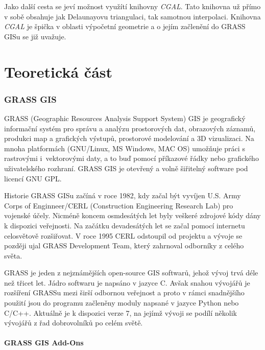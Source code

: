 \documentclass[12pt,a4paper]{article}
\begin{document}
Jako další cesta se jeví možnost využítí knihovny \emph{CGAL}. Tato
knihovna už přímo v sobě obsahuje jak Delaunayovu triangulaci, tak
samotnou interpolaci. Knihovna \emph{CGAL} je špička v oblasti
výpočetní geometrie a o jejím začlenění do GRASS GISu se již uvažuje.

\newpage
\part{Teoretická část}

\newpage
\section{GRASS GIS}

GRASS (Geographic Resources Analysis Support System)
GIS je geografický informační systém
pro správu a analýzu prostorových dat, obrazových záznamů, produkci
map a grafických výstupů, prostorové modelování a 3D vizualizaci. Na
mnoha platformách (GNU/Linux, MS Windows, MAC OS) umožňuje práci s
rastrovými i~vektorovými daty, a to buď pomocí příkazové řádky nebo
grafického uživatelského rozhraní. GRASS GIS je otevřený a volně
šiřitelný software pod licencí GNU GPL.

Historie\cite{rukovet} GRASS GISu začíná v roce 1982, kdy začal být
vyvíjen U.S. Army Corps of Enginneer/CERL (Construction Engineering
Research Lab) pro vojenské účely. Nicméně koncem osmdesátých let byly
veškeré zdrojové kódy dány k dispozici veřejnosti. Na začátku
devadesátých let se začal pomocí internetu celosvětově rozšiřovat. V
roce 1995 CERL odstoupil od projektu a vývoje se později ujal GRASS
Development Team, který zahrnoval odborníky z celého světa.

GRASS je jeden z nejznámějších open-source GIS softwarů, jehož vývoj
trvá déle než třicet let. Jádro softwaru je napsáno v jazyce C. Avšak
snahou vývojářů je rozšíření GRASSu mezi širší odbornou veřejnost a
proto v rámci snadnějšího použití jsou do programu začleněny moduly
napsané v jazyce Python nebo C/C++. Aktuálně je k dispozici verze 7, na
jejímž vývoji se podílí několik vývojářů z řad dobrovolníků po celém
světě.

\subsection{GRASS GIS Add-Ons}
\label{sub:addons}
\end{document}
